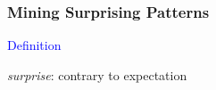 \documentclass{beamer}
\begin{document}
\begin{frame}
  \frametitle{Mining Surprising Patterns}

  






  
  \textcolor{blue}{Definition}
  \begin{center}\emph{surprise}: \alert{contrary to expectation}\end{center}


\end{frame}
\end{document}
